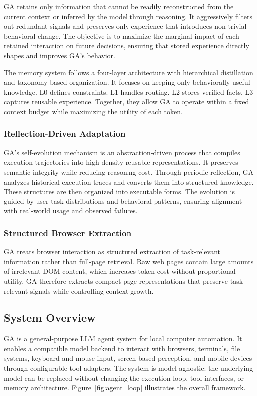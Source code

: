 GA retains only information that cannot be readily reconstructed from the current context or inferred by the model through reasoning. It aggressively filters out redundant signals and preserves only experience that introduces non-trivial behavioral change. The objective is to maximize the marginal impact of each retained interaction on future decisions, ensuring that stored experience directly shapes and improves GA's behavior.

The memory system follows a four-layer architecture with hierarchical distillation and taxonomy-based organization. It focuses on keeping only behaviorally useful knowledge. L0 defines constraints. L1 handles routing. L2 stores verified facts. L3 captures reusable experience. Together, they allow GA to operate within a fixed context budget while maximizing the utility of each token.

\subsubsection{Reflection-Driven Adaptation}
GA’s self-evolution mechanism is an abstraction-driven process that compiles execution trajectories into high-density reusable representations. It preserves semantic integrity while reducing reasoning cost. Through periodic reflection, GA analyzes historical execution traces and converts them into structured knowledge. These structures are then organized into executable forms. The evolution is guided by user task distributions and behavioral patterns, ensuring alignment with real-world usage and observed failures.

\subsubsection{Structured Browser Extraction}
GA treats browser interaction as structured extraction of task-relevant information rather than full-page retrieval. Raw web pages contain large amounts of irrelevant DOM content, which increases token cost without proportional utility. GA therefore extracts compact page representations that preserve task-relevant signals while controlling context growth.

\subsection{System Overview}
\label{sec:overview}
GA is a general-purpose LLM agent system for local computer automation. It enables a compatible model backend to interact with browsers, terminals, file systems, keyboard and mouse input, screen-based perception, and mobile devices through configurable tool adapters. The system is model-agnostic: the underlying model can be replaced without changing the execution loop, tool interfaces, or memory architecture. Figure~\ref{fig:agent_loop} illustrates the overall framework.

